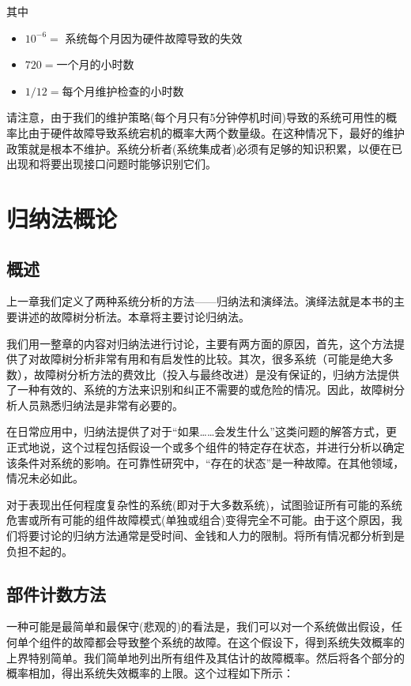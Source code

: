\documentclass[cn,11pt,chinese]{elegantbook}
\begin{document}
其中

\begin{itemize}
	\item $ 10^{-6} =$ 系统每个月因为硬件故障导致的失效 
	\item $ 720  = $一个月的小时数
	\item $ 1/12  = $每个月维护检查的小时数
\end{itemize}

请注意，由于我们的维护策略(每个月只有5分钟停机时间)导致的系统可用性的概率比由于硬件故障导致系统宕机的概率大两个数量级。在这种情况下，最好的维护政策就是根本不维护。系统分析者(系统集成者)必须有足够的知识积累，以便在已出现和将要出现接口问题时能够识别它们。

\chapter{归纳法概论}
\section{概述}

上一章我们定义了两种系统分析的方法——归纳法和演绎法。演绎法就是本书的主要讲述的故障树分析法。本章将主要讨论归纳法。

我们用一整章的内容对归纳法进行讨论，主要有两方面的原因，首先，这个方法提供了对故障树分析非常有用和有启发性的比较。其次，很多系统（可能是绝大多数），故障树分析方法的费效比（投入与最终改进）是没有保证的，归纳方法提供了一种有效的、系统的方法来识别和纠正不需要的或危险的情况。因此，故障树分析人员熟悉归纳法是非常有必要的。

在日常应用中，归纳法提供了对于“如果……会发生什么”这类问题的解答方式，更正式地说，这个过程包括假设一个或多个组件的特定存在状态，并进行分析以确定该条件对系统的影响。在可靠性研究中，“存在的状态”是一种故障。在其他领域，情况未必如此。

对于表现出任何程度复杂性的系统(即对于大多数系统)，试图验证所有可能的系统危害或所有可能的组件故障模式(单独或组合)变得完全不可能。由于这个原因，我们将要讨论的归纳方法通常是受时间、金钱和人力的限制。将所有情况都分析到是负担不起的。

\section{部件计数方法}

一种可能是最简单和最保守(悲观的)的看法是，我们可以对一个系统做出假设，任何单个组件的故障都会导致整个系统的故障。在这个假设下，得到系统失效概率的上界特别简单。我们简单地列出所有组件及其估计的故障概率。然后将各个部分的概率相加，得出系统失效概率的上限。这个过程如下所示：
\end{document}
